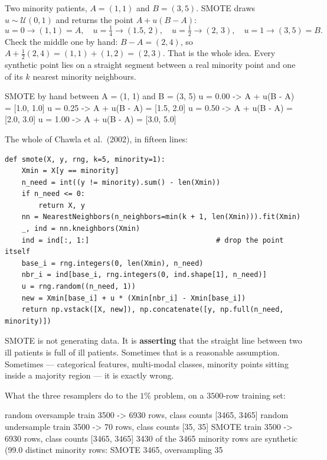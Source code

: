 \documentclass[11pt]{article}
\begin{document}
\begin{worked}
Two minority patients, $A = (1, 1)$ and $B = (3, 5)$. SMOTE draws
$u \sim \mathcal{U}(0,1)$ and returns the point $A + u(B - A)$:
\[
  u = 0 \to (1,1) = A, \quad
  u = \tfrac14 \to (1.5,\, 2), \quad
  u = \tfrac12 \to (2,\, 3), \quad
  u = 1 \to (3,5) = B.
\]
Check the middle one by hand: $B - A = (2, 4)$, so
$A + \tfrac12(2,4) = (1,1) + (1,2) = (2,3)$. That is the whole idea. Every
synthetic point lies on a straight segment between a real minority point and
one of its $k$ nearest minority neighbours.
\end{worked}

\begin{codeout}
SMOTE by hand between A = (1, 1) and B = (3, 5)
   u = 0.00  ->  A + u(B - A) = [1.0, 1.0]
   u = 0.25  ->  A + u(B - A) = [1.5, 2.0]
   u = 0.50  ->  A + u(B - A) = [2.0, 3.0]
   u = 1.00  ->  A + u(B - A) = [3.0, 5.0]
\end{codeout}

The whole of Chawla et al.\ (2002), in fifteen lines:

\begin{lstlisting}
def smote(X, y, rng, k=5, minority=1):
    Xmin = X[y == minority]
    n_need = int((y != minority).sum() - len(Xmin))
    if n_need <= 0:
        return X, y
    nn = NearestNeighbors(n_neighbors=min(k + 1, len(Xmin))).fit(Xmin)
    _, ind = nn.kneighbors(Xmin)
    ind = ind[:, 1:]                              # drop the point itself
    base_i = rng.integers(0, len(Xmin), n_need)
    nbr_i = ind[base_i, rng.integers(0, ind.shape[1], n_need)]
    u = rng.random((n_need, 1))
    new = Xmin[base_i] + u * (Xmin[nbr_i] - Xmin[base_i])
    return np.vstack([X, new]), np.concatenate([y, np.full(n_need, minority)])
\end{lstlisting}

\begin{keyidea}
SMOTE is not generating data. It is \textbf{asserting} that the straight line
between two ill patients is full of ill patients. Sometimes that is a
reasonable assumption. Sometimes --- categorical features, multi-modal
classes, minority points sitting inside a majority region --- it is exactly
wrong.
\end{keyidea}

What the three resamplers do to the $1\%$ problem, on a $3500$-row training
set:

\begin{codeout}
   random oversample   train  3500 ->  6930 rows,  class counts [3465, 3465]
   random undersample  train  3500 ->    70 rows,  class counts [35, 35]
   SMOTE               train  3500 ->  6930 rows,  class counts [3465, 3465]
      3430 of the 3465 minority rows are synthetic (99.0%
      distinct minority rows: SMOTE 3465, oversampling 35
\end{codeout}
\end{document}
